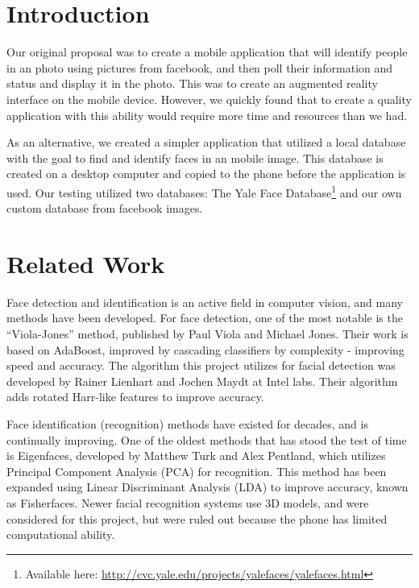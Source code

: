 \section{Introduction} %


Our original proposal was to create a mobile application that will
identify people in an photo using pictures from facebook, and then
poll their information and status and display it in the photo.  This
was to create an augmented reality interface on the mobile device.
However, we quickly found that to create a quality application with
this ability would require more time and resources than we had.

As an alternative, we created a simpler application that utilized a
local database with the goal to find and identify faces in an mobile
image.  This database is created on a desktop computer and copied to
the phone before the application is used.  Our testing utilized two
databases: The Yale Face Database\footnote{Available here:
  \url{http://cvc.yale.edu/projects/yalefaces/yalefaces.html}}
\cite{YaleFace} and our own custom database from facebook images.

\section{Related Work} %

Face detection and identification is an active field in computer
vision, and many methods have been developed.  For face detection, one
of the most notable is the ``Viola-Jones'' method, published by Paul
Viola and Michael Jones.\cite{ViolaJones} Their work is based on
AdaBoost\cite{AdaBoost}, improved by cascading classifiers by
complexity - improving speed and accuracy.  The algorithm this project
utilizes for facial detection was developed by Rainer Lienhart and
Jochen Maydt at Intel labs.\cite{Lienhart} Their algorithm adds
rotated Harr-like features to improve accuracy.

Face identification (recognition) methods have existed for decades,
and is continually improving.  One of the oldest methods that has
stood the test of time is Eigenfaces\cite{Eigenfaces}, developed by
Matthew Turk and Alex Pentland, which utilizes Principal Component
Analysis (PCA) for recognition.  This method has been expanded using
Linear Discriminant Analysis (LDA) to improve accuracy, known as
Fisherfaces. \cite{Fisherfaces} Newer facial recognition systems use
3D models\cite{3d}, and were considered for this project, but were
ruled out because the phone has limited computational ability.

